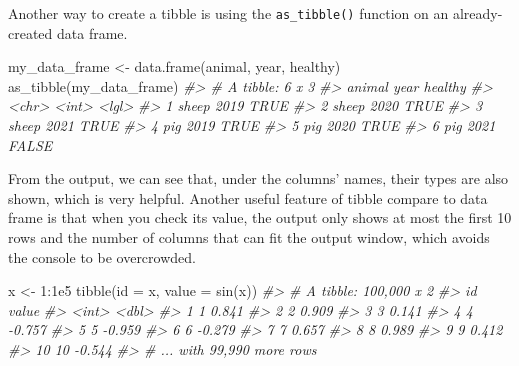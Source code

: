 \documentclass[
]{book}
\newenvironment{Shaded}{\begin{snugshade}}{\end{snugshade}}
\newcommand{\AttributeTok}[1]{\textcolor[rgb]{0.77,0.63,0.00}{#1}}
\newcommand{\CommentTok}[1]{\textcolor[rgb]{0.56,0.35,0.01}{\textit{#1}}}
\newcommand{\DecValTok}[1]{\textcolor[rgb]{0.00,0.00,0.81}{#1}}
\newcommand{\FloatTok}[1]{\textcolor[rgb]{0.00,0.00,0.81}{#1}}
\newcommand{\FunctionTok}[1]{\textcolor[rgb]{0.00,0.00,0.00}{#1}}
\newcommand{\NormalTok}[1]{#1}
\newcommand{\OtherTok}[1]{\textcolor[rgb]{0.56,0.35,0.01}{#1}}
\newcommand{\SpecialCharTok}[1]{\textcolor[rgb]{0.00,0.00,0.00}{#1}}
\begin{document}
Another way to create a tibble is using the \texttt{as\_tibble()} function on an already-created data frame.

\begin{Shaded}
\begin{Highlighting}[]
\NormalTok{my\_data\_frame }\OtherTok{\textless{}{-}} \FunctionTok{data.frame}\NormalTok{(animal, year, healthy)}
\FunctionTok{as\_tibble}\NormalTok{(my\_data\_frame)}
\CommentTok{\#\textgreater{} \# A tibble: 6 x 3}
\CommentTok{\#\textgreater{}   animal  year healthy}
\CommentTok{\#\textgreater{}   \textless{}chr\textgreater{}  \textless{}int\textgreater{} \textless{}lgl\textgreater{}  }
\CommentTok{\#\textgreater{} 1 sheep   2019 TRUE   }
\CommentTok{\#\textgreater{} 2 sheep   2020 TRUE   }
\CommentTok{\#\textgreater{} 3 sheep   2021 TRUE   }
\CommentTok{\#\textgreater{} 4 pig     2019 TRUE   }
\CommentTok{\#\textgreater{} 5 pig     2020 TRUE   }
\CommentTok{\#\textgreater{} 6 pig     2021 FALSE}
\end{Highlighting}
\end{Shaded}

From the output, we can see that, under the columns' names, their types are also shown, which is very helpful. Another useful feature of tibble compare to data frame is that when you check its value, the output only shows at most the first 10 rows and the number of columns that can fit the output window, which avoids the console to be overcrowded.

\begin{Shaded}
\begin{Highlighting}[]
\NormalTok{x }\OtherTok{\textless{}{-}} \DecValTok{1}\SpecialCharTok{:}\FloatTok{1e5}
\FunctionTok{tibble}\NormalTok{(}\AttributeTok{id =}\NormalTok{ x, }\AttributeTok{value =} \FunctionTok{sin}\NormalTok{(x))}
\CommentTok{\#\textgreater{} \# A tibble: 100,000 x 2}
\CommentTok{\#\textgreater{}       id  value}
\CommentTok{\#\textgreater{}    \textless{}int\textgreater{}  \textless{}dbl\textgreater{}}
\CommentTok{\#\textgreater{}  1     1  0.841}
\CommentTok{\#\textgreater{}  2     2  0.909}
\CommentTok{\#\textgreater{}  3     3  0.141}
\CommentTok{\#\textgreater{}  4     4 {-}0.757}
\CommentTok{\#\textgreater{}  5     5 {-}0.959}
\CommentTok{\#\textgreater{}  6     6 {-}0.279}
\CommentTok{\#\textgreater{}  7     7  0.657}
\CommentTok{\#\textgreater{}  8     8  0.989}
\CommentTok{\#\textgreater{}  9     9  0.412}
\CommentTok{\#\textgreater{} 10    10 {-}0.544}
\CommentTok{\#\textgreater{} \# ... with 99,990 more rows}
\end{Highlighting}
\end{Shaded}
\end{document}
